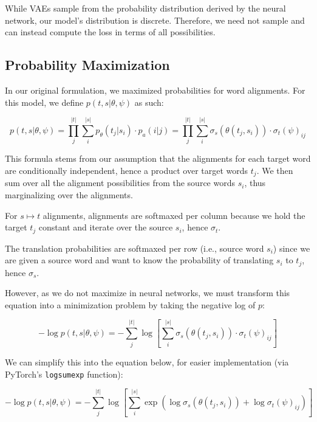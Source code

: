 \documentclass[twoside,twocolumn]{article}
\newlength\mystoreparindent
\newenvironment{myparindent}[1]{%
  \setlength{\mystoreparindent}{\the\parindent}
  \setlength{\parindent}{#1}
  }{%
  \setlength{\parindent}{\mystoreparindent}
}
\begin{document}
\begin{myparindent}{0pt}
While VAEs sample from the probability distribution derived by the neural
network, our model's distribution is discrete. Therefore, we need not
sample and can instead compute the loss in terms of all possibilities.

\subsection{Probability Maximization}

In our original formulation, we
maximized probabilities for word alignments.
For this model, we define $p(t, s | \theta, \psi)$ as such:

\begin{equation}
  p(t, s | \theta, \psi)
    = \prod_j^{|t|} \sum_i^{|s|} p_\theta(t_j| s_i) \cdot p_a(i|j)
    = \prod_j^{|t|} \sum_i^{|s|} \sigma_s(\theta(t_j, s_i)) \cdot \sigma_t(\psi)_{ij}
\end{equation}

This formula stems from our assumption that the alignments for each
target word are conditionally independent, hence a product over target
words $t_j$. We then sum over all the alignment possibilities from the source
words $s_i$, thus marginalizing over the alignments.

For $s \mapsto t$ alignments, alignments are softmaxed per column because
we hold the target $t_j$ constant and iterate
over the source $s_i$, hence $\sigma_t$.

The translation probabilities are softmaxed per row (i.e., source word $s_i$)
since we are given a source word and want to know the probability of
translating $s_i$ to $t_j$, hence $\sigma_s$.

However, as we do not maximize in neural networks, we must transform this
equation into a minimization problem by taking the negative log of $p$:

\begin{equation}
  -\log p(t, s | \theta, \psi) =
  - \sum_j^{|t|}
     \log \left[ \sum_i^{|s|} \sigma_s \left( \theta(t_j, s_i) \right) \cdot
      \sigma_t(\psi)_{ij} \right]
\end{equation}

We can simplify this into the equation below, for easier implementation
(via PyTorch's \texttt{logsumexp} function):

\begin{equation}
  -\log  p(t , s | \theta, \psi) =
  - \sum_j^{|t|}  \log \left[ \sum_i^{|s|} \exp
      \left( \log \sigma_s(\theta(t_j, s_i)) + \log \sigma_t(\psi)_{ij} \right)
    \right]
\end{equation}


\end{myparindent}
\end{document}
